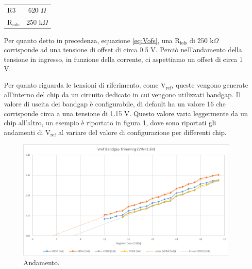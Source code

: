 \begin{center}
\begin{tabular}{lc}
\hline
$\mathrm{R3}$ & 620 $\Omega$ \\
$\mathrm{R_{iofs}}$ & 250 k$\Omega$\\ 
\hline
\end{tabular}
\end{center}
Per quanto detto in precedenza, equazione \ref{eq:Vofs}, una $\mathrm{R_{iofs}}$ di 250 k$\Omega$ corrisponde ad una tensione di offset di circa 0.5 V. Perciò nell'andamento della tensione in ingresso, in funzione della corrente, ci aspettiamo un offset di circa 1 V.

Per quanto riguarda le tensioni di riferimento, come $\mathrm{V_{ref}}$, queste vengono generate all'interno del chip da un circuito dedicato in cui vengono utilizzati bandgap. Il valore di uscita dei bandgap è configurabile, di default ha un valore 16 che corrisponde circa a una tensione di 1.15 V. 
Questo valore varia leggermente da un chip all'altro, un esempio è riportato in figura \ref{bandgap_trimming}, dove sono riportati gli andamenti di $\mathrm{V_{ref}}$ al variare del valore di configurazione per differenti chip.

\begin{figure}
\centering
\includegraphics[scale=.5]{Immagini/bandgap_trimming}
\caption{Andamento.}
\label{bandgap_trimming}
\end{figure}

